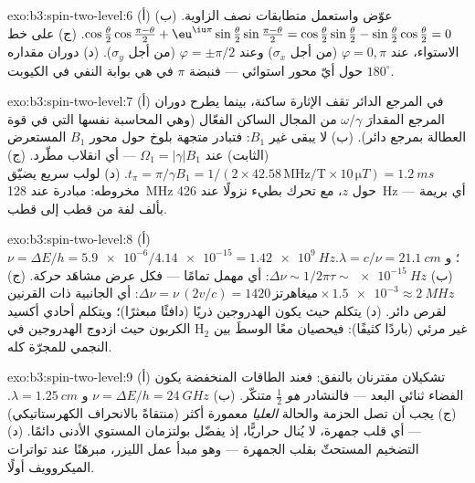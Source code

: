 \begin{solution}{exo:b3:spin-two-level:6}
(أ) عوّض واستعمل متطابقات نصف الزاوية. (ب)
$\cos\tfrac\theta2\cos\tfrac{\pi-\theta}2 +
\eu^{\iu\pi}\sin\tfrac\theta2\sin\tfrac{\pi-\theta}2 =
\cos\tfrac\theta2\sin\tfrac\theta2 -
\sin\tfrac\theta2\cos\tfrac\theta2 = 0$. (ج) على خط الاستواء، عند
$\varphi = 0, \pi$ (من أجل $\sigma_x$) وعند $\varphi = \pm\pi/2$
(من أجل $\sigma_y$). (د) دوران مقداره $180^\circ$ حول أيّ محور استوائي
--- فنبضة $\pi$ في  هي بوابة النفي في الكيوبت.
\end{solution}

\begin{solution}{exo:b3:spin-two-level:7}
(أ) في المرجع الدائر تقف الإثارة ساكنة، بينما يطرح دوران
المرجع المقدارَ $\omega/\gamma$ من المجال الساكن الفعّال
(وهي المحاسبة نفسها التي في قوة العطالة بمرجع دائر). (ب) لا
يبقى غير $B_1$: فتبادر متجهة بلوخ حول محور $B_1$ المستعرض
(الثابت) عند $\Omega_1 = |\gamma|B_1$ --- أي انقلاب
مطّرد. (ج) $t_\pi = \pi/\gamma B_1 = 1/(2 \times 42.58\,\text{
MHz/T} \times 10\,\unit{\micro T}) = \qty{1.2}{ms}$. (د) لولب
سريع يضيّق مخروطه: مبادرة عند \qty{128}{MHz} حول $z$،
مع تحرك بطيء نزولًا عند \qty{426}{Hz} --- أي بريمة بألف لفة
من قطب إلى قطب.
\end{solution}

\begin{solution}{exo:b3:spin-two-level:8}
(أ) $\nu = \Delta E/h = \num{5.9e-6}/\num{4.14e-15} =
\qty{1.42e9}{Hz}$؛ و $\lambda = c/\nu = \qty{21.1}{cm}$. (ب) $\Delta
\nu \sim 1/2\pi\tau \sim \qty{e-15}{Hz}$: أي مهمل تمامًا ---
فكل عرض مشاهَد حركة. (ج) $\Delta\nu =
\nu\,(2v/c) = 1420\,\text{ميغاهرتز} \times \num{1.5e-3} \approx
\qty{2}{MHz}$: أي الجانبية ذات القرنين لقرص دائر. (د)
يتكلم  حيث يكون الهدروجين ذريًا (دافئًا مبعثرًا)؛ ويتكلم
أحادي أكسيد الكربون حيث ازدوج الهدروجين في H$_2$ غير مرئي (باردًا
كثيفًا): فيحصيان معًا الوسطَ بين النجمي للمجرّة كله.
\end{solution}

\begin{solution}{exo:b3:spin-two-level:9}
(أ) تشكيلان مقترنان بالنفق: فعند الطاقات المنخفضة يكون الفضاء
ثنائي البعد --- فالنشادر \emph{هو}  $\tfrac12$
متنكّر. (ب) $\nu = \Delta E/h = \qty{24}{GHz}$ و $\lambda =
\qty{1.25}{cm}$. (ج) يجب أن تصل الحزمة والحالة \emph{العليا}
معمورة أكثر (منتقاةً بالانحراف الكهرستاتيكي) ---
أي قلب جمهرة، لا يُنال حراريًّا، إذ يفضّل بولتزمان
المستوي الأدنى دائمًا. (د) التضخيم المستحثّ بقلب
الجمهرة --- وهو مبدأ عمل الليزر،
مبرهَنًا عند تواترات الميكروويف أولًا.
\end{solution}

